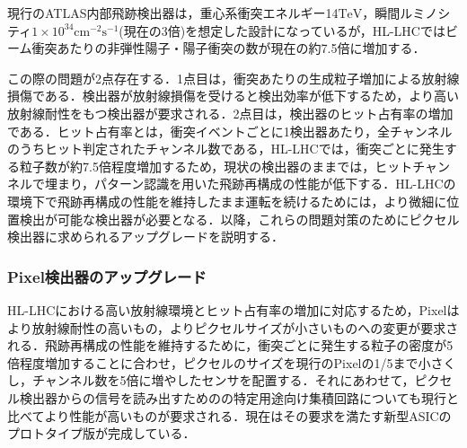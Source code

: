 現行のATLAS内部飛跡検出器は，重心系衝突エネルギー14$\mathrm{TeV}$，瞬間ルミノシティ$1 \times 10^34 \mathrm{cm^{-2} s^{-1}}$(現在の3倍)を想定した設計になっているが，HL-LHCではビーム衝突あたりの非弾性陽子・陽子衝突の数が現在の約7.5倍に増加する．\par
この際の問題が2点存在する．1点目は，衝突あたりの生成粒子増加による放射線損傷である．検出器が放射線損傷を受けると検出効率が低下するため，より高い放射線耐性をもつ検出器が要求される．2点目は，検出器のヒット占有率の増加である．ヒット占有率とは，衝突イベントごとに1検出器あたり，全チャンネルのうちヒット判定されたチャンネル数である，HL-LHCでは，衝突ごとに発生する粒子数が約7.5倍程度増加するため，現状の検出器のままでは，ヒットチャンネルで埋まり，パターン認識を用いた飛跡再構成の性能が低下する．HL-LHCの環境下で飛跡再構成の性能を維持したまま運転を続けるためには，より微細に位置検出が可能な検出器が必要となる．以降，これらの問題対策のためにピクセル検出器に求められるアップグレードを説明する．\par

\subsubsection*{Pixel検出器のアップグレード}
HL-LHCにおける高い放射線環境とヒット占有率の増加に対応するため，Pixelはより放射線耐性の高いもの，よりピクセルサイズが小さいものへの変更が要求される．飛跡再構成の性能を維持するために，衝突ごとに発生する粒子の密度が5倍程度増加することに合わせ，ピクセルのサイズを現行のPixelの1/5まで小さくし，チャンネル数を5倍に増やしたセンサを配置する．それにあわせて，ピクセル検出器からの信号を読み出すためのの特定用途向け集積回路についても現行と比べてより性能が高いものが要求される．現在はその要求を満たす新型ASICのプロトタイプ版が完成している．\par




